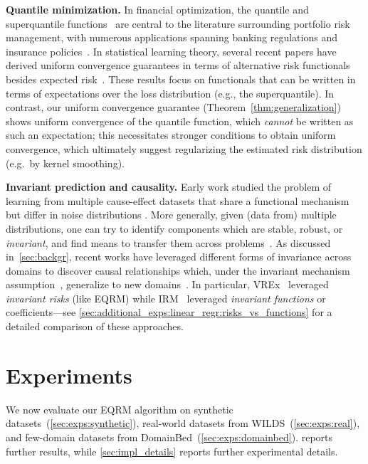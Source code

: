 \documentclass{article}
\begin{document}
\textbf{Quantile minimization.} In financial optimization, the quantile and superquantile functions~\citep{duffie1997overview, rockafellar2000CVaR,krokhmal2002portfolio} are central to the literature surrounding portfolio risk management, with numerous applications spanning banking regulations and insurance policies~\cite{wozabal2012value,jorion1997value}.
%
In statistical learning theory, several recent papers have derived uniform convergence guarantees in terms of alternative risk functionals besides expected risk~\citep{lee2020learning,khim2020uniform,duchi2021learning,curi2020adaptive}. These results focus on functionals that can be written in terms of expectations over the loss distribution (e.g., the superquantile). In contrast, our uniform convergence guarantee (Theorem~\ref{thm:generalization}) shows uniform convergence of the quantile function, which \emph{cannot} be written as such an expectation; this necessitates stronger conditions to obtain uniform convergence, which ultimately suggest regularizing the estimated risk distribution (e.g.\ by kernel smoothing).


\textbf{Invariant prediction and causality.}
Early work studied the problem of learning from multiple cause-effect datasets that share a functional mechanism but differ in noise distributions \citep{schoelkopf2012causal}. More generally, given (data from) multiple distributions, one can try to identify components which are stable, robust, or \emph{invariant}, and find means to transfer them across problems~\cite{zhang2013domain,Bareinboim2014,zhang2015multi,gong2016domain,HuaZhaZhaSanGlySch17}. 
As discussed in~\cref{sec:backgr}, recent works have leveraged different forms of invariance across domains to discover causal relationships which, under the invariant mechanism assumption~\cite{peters2017elements}, generalize to new domains~\cite{peters2016causal, rojas2018invariant, arjovsky2020invariant, krueger21rex, heinze2018invariant, pfister2019invariant, gamella2020active}.
%
In particular, VREx~\citep{krueger21rex} leveraged \textit{invariant risks} (like EQRM) while IRM~\citep{arjovsky2020invariant} leveraged \textit{invariant functions} or coefficients---see \cref{sec:additional_exps:linear_regr:risks_vs_functions} for a detailed comparison of these approaches.


\section{Experiments}%
\label{sec:exps}%
We now evaluate our EQRM algorithm on synthetic datasets~(\cref{sec:exps:synthetic}), real-world datasets from WILDS~(\cref{sec:exps:real}), and few-domain datasets from DomainBed~(\cref{sec:exps:domainbed}).  reports further results, while \cref{sec:impl_details} reports further experimental details.
\end{document}
